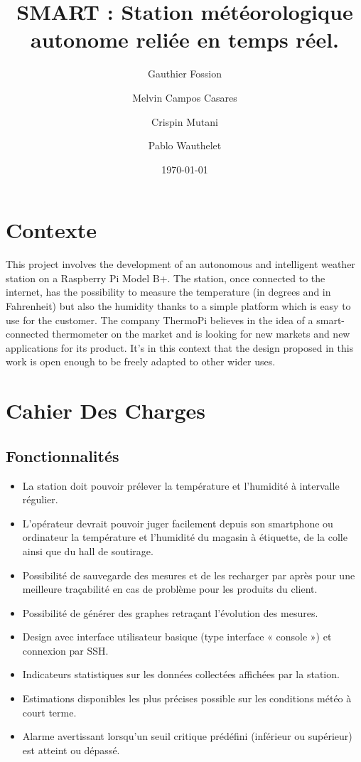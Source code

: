 \documentclass[10pt]{article}
\title{SMART : Station météorologique autonome reliée en temps réel.}
\author{Gauthier Fossion \and Melvin Campos Casares \and Crispin Mutani \and Pablo Wauthelet}
\date{\today}
\begin{document}
\maketitle


\section{Contexte}

This project involves the development of an autonomous and intelligent weather station on a Raspberry Pi Model B+. The station, once connected to the internet, has the possibility to measure the temperature (in degrees and in Fahrenheit) but also the humidity thanks to a simple platform which is easy to use for the customer.
The company ThermoPi believes in the idea of a smart-connected thermometer on the market and is looking for new markets and new applications for its product. It’s in this context that the design proposed in this work is open enough to be freely adapted to other wider uses.

\tableofcontents

\section{Cahier Des Charges}

\subsection{Fonctionnalités}
\begin{itemize}
\item La station doit pouvoir prélever la température et l’humidité à intervalle régulier.
\item L’opérateur devrait pouvoir juger facilement depuis son smartphone ou ordinateur la température et l’humidité du magasin à étiquette, de la colle ainsi que du hall de soutirage.
\item Possibilité de sauvegarde des mesures et de les recharger par après pour une meilleure traçabilité en cas de problème pour les produits du client.
\item Possibilité de générer des graphes retraçant l’évolution des mesures.
\item Design avec interface utilisateur basique (type interface « console ») et connexion par SSH.
\item Indicateurs statistiques sur les données collectées affichées par la station.
\item Estimations disponibles les plus précises possible sur les conditions météo à court terme.
\item Alarme avertissant lorsqu’un seuil critique prédéfini (inférieur ou supérieur) est atteint ou dépassé.
\end{itemize}
\end{document}

